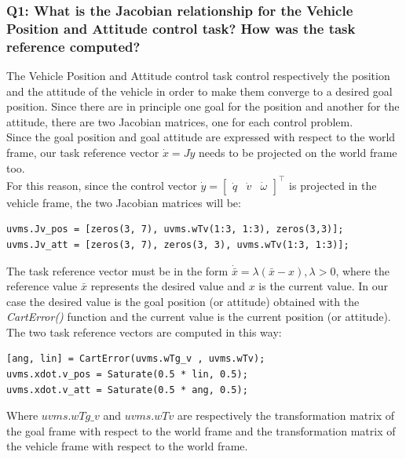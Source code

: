 \documentclass{article}
\begin{document}
\subsubsection{Q1: What is the Jacobian relationship for the Vehicle Position and Attitude control task? How was the task reference computed?}
The Vehicle Position and Attitude control task control respectively the position and the attitude of the vehicle in order to make them converge to a desired goal position. Since there are in principle one goal for the position and another for the attitude, there are two Jacobian matrices, one for each control problem. \\
Since the goal position and goal attitude are expressed with respect to the world frame, our task reference vector $ \dot{x} = J\dot{y} $ needs to be projected on the world frame too. \\
For this reason, since the control vector $ \dot{y} = \begin{bmatrix} \dot{q} & \dot{v} & \dot{\omega}\end{bmatrix}^\top $ is projected in the vehicle frame, the two Jacobian matrices will be:
\begin{lstlisting}
uvms.Jv_pos = [zeros(3, 7), uvms.wTv(1:3, 1:3), zeros(3,3)]; 
uvms.Jv_att = [zeros(3, 7), zeros(3, 3), uvms.wTv(1:3, 1:3)];
\end{lstlisting}

The task reference vector must be in the form $ \dot{\bar{x}} = \lambda(\bar{x} - x), \lambda > 0 $, where the reference value $ \bar{x} $ represents the desired value and $ x $ is the current value. In our case the desired value is the goal position (or attitude) obtained with the \textit{CartError()} function and the current value is the current position (or attitude). \\
The two task reference vectors are computed in this way:
\begin{lstlisting}
[ang, lin] = CartError(uvms.wTg_v , uvms.wTv);
uvms.xdot.v_pos = Saturate(0.5 * lin, 0.5);
uvms.xdot.v_att = Saturate(0.5 * ang, 0.5);
\end{lstlisting}
Where $ uvms.wTg\_v $ and $ uvms.wTv $ are respectively the transformation matrix of the goal frame with respect to the world frame and the transformation matrix of the vehicle frame with respect to the world frame. 
\end{document}
